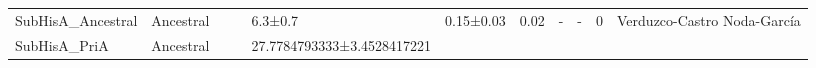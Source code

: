 \documentclass[12pt,twoside]{reedthesis}
\begin{document}
\begin{longtable}[]{@{}lllllllllll@{}}
\begin{minipage}[t]{0.15\columnwidth}
  SubHisA\_Ancestral\strut
  \end{minipage} & \begin{minipage}[t]{0.05\columnwidth}\raggedright\strut
  Ancestral\strut
  \end{minipage} & \begin{minipage}[t]{0.04\columnwidth}\raggedright\strut
  \strut
  \end{minipage} & \begin{minipage}[t]{0.04\columnwidth}\raggedright\strut
  \strut
  \end{minipage} & \begin{minipage}[t]{0.06\columnwidth}\raggedright\strut
  6.3±0.7\strut
  \end{minipage} & \begin{minipage}[t]{0.06\columnwidth}\raggedright\strut
  0.15±0.03\strut
  \end{minipage} & \begin{minipage}[t]{0.06\columnwidth}\raggedright\strut
  0.02\strut
  \end{minipage} & \begin{minipage}[t]{0.05\columnwidth}\raggedright\strut
  -\strut
  \end{minipage} & \begin{minipage}[t]{0.05\columnwidth}\raggedright\strut
  -\strut
  \end{minipage} & \begin{minipage}[t]{0.03\columnwidth}\raggedright\strut
  0\strut
  \end{minipage} & \begin{minipage}[t]{0.11\columnwidth}\raggedright\strut
  Verduzco-Castro Noda-García\strut
  \end{minipage}\tabularnewline
  \begin{minipage}[t]{0.15\columnwidth}\raggedright\strut
  SubHisA\_PriA\strut
  \end{minipage} & \begin{minipage}[t]{0.05\columnwidth}\raggedright\strut
  Ancestral\strut
  \end{minipage} & \begin{minipage}[t]{0.04\columnwidth}\raggedright\strut
  \strut
  \end{minipage} & \begin{minipage}[t]{0.04\columnwidth}\raggedright\strut
  \strut
  \end{minipage} & \begin{minipage}[t]{0.06\columnwidth}\raggedright\strut
  27.7784793333±3.4528417221\strut

\end{minipage}
\end{longtable}
\end{document}
